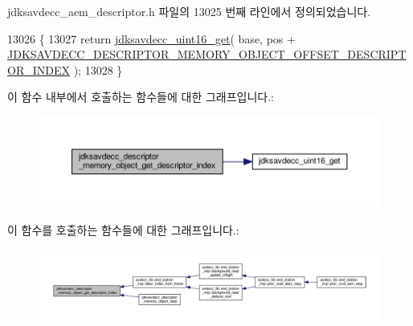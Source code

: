 jdksavdecc\+\_\+aem\+\_\+descriptor.\+h 파일의 13025 번째 라인에서 정의되었습니다.


\begin{DoxyCode}
13026 \{
13027     \textcolor{keywordflow}{return} \hyperlink{group__endian_ga3fbbbc20be954aa61e039872965b0dc9}{jdksavdecc\_uint16\_get}( base, pos + 
      \hyperlink{group__descriptor__memory__object_ga87b3c2bc203838d734867aa999b68b88}{JDKSAVDECC\_DESCRIPTOR\_MEMORY\_OBJECT\_OFFSET\_DESCRIPTOR\_INDEX}
       );
13028 \}
\end{DoxyCode}


이 함수 내부에서 호출하는 함수들에 대한 그래프입니다.\+:
\nopagebreak
\begin{figure}[H]
\begin{center}
\leavevmode
\includegraphics[width=350pt]{group__descriptor__memory__object_ga1a5e3258584bf1095c4c5a59cb7f9da0_cgraph}
\end{center}
\end{figure}




이 함수를 호출하는 함수들에 대한 그래프입니다.\+:
\nopagebreak
\begin{figure}[H]
\begin{center}
\leavevmode
\includegraphics[width=350pt]{group__descriptor__memory__object_ga1a5e3258584bf1095c4c5a59cb7f9da0_icgraph}
\end{center}
\end{figure}


